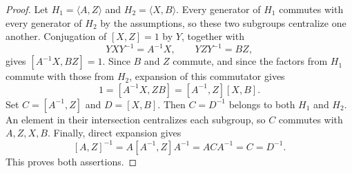\begin{proof}
Let $H_1=\langle A,Z\rangle$ and $H_2=\langle X,B\rangle$.
Every generator of $H_1$ commutes with every generator of $H_2$ by the
assumptions, so these two subgroups centralize one another.
Conjugation of $[X,Z]=1$ by $Y$, together with
\[
 YXY^{-1}=A^{-1}X,
 \qquad
 YZY^{-1}=BZ,
\]
gives $[A^{-1}X,BZ]=1$.  Since $B$ and $Z$ commute, and since the
factors from $H_1$ commute with those from $H_2$, expansion of this
commutator gives
\[
 1=[A^{-1}X,ZB]=[A^{-1},Z][X,B].
\]
Set $C=[A^{-1},Z]$ and $D=[X,B]$.  Then $C=D^{-1}$ belongs to both
$H_1$ and $H_2$.  An element in their intersection centralizes each
subgroup, so $C$ commutes with $A,Z,X,B$.  Finally, direct expansion
gives
\[
 [A,Z]^{-1}=A[A^{-1},Z]A^{-1}=ACA^{-1}=C=D^{-1}.
\]
This proves both assertions.
\end{proof}

